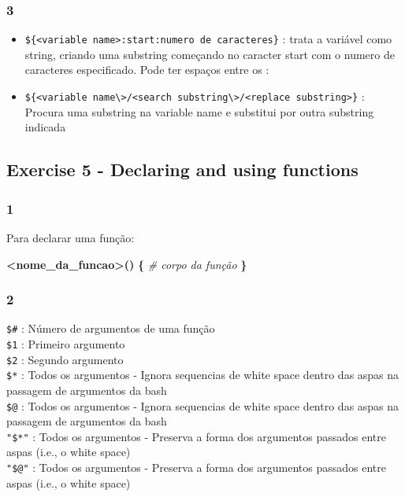 \documentclass[]{article}
\newenvironment{Shaded}{}{}
\newcommand{\KeywordTok}[1]{\textcolor[rgb]{0.00,0.44,0.13}{\textbf{{#1}}}}
\newcommand{\CommentTok}[1]{\textcolor[rgb]{0.38,0.63,0.69}{\textit{{#1}}}}
\begin{document}
\subsubsection{3}\label{section-10}

\begin{itemize}
\itemsep1pt\parskip0pt
\item
  \texttt{\$\{\textless{}variable name\textgreater{}:start:numero de caracteres\}}
  : trata a variável como string, criando uma substring começando no
  caracter start com o numero de caracteres especificado. Pode ter
  espaços entre os :\\
\item
  \texttt{\$\{\textless{}variable name\textbackslash{}\textgreater{}/\textless{}search substring\textbackslash{}\textgreater{}/\textless{}replace substring\textgreater{}\}}
  : Procura uma substring na variable name e substitui por outra
  substring indicada
\end{itemize}

\subsection{Exercise 5 - Declaring and using
functions}\label{exercise-5---declaring-and-using-functions}

\subsubsection{1}\label{section-11}

Para declarar uma função:

\begin{Shaded}
\begin{Highlighting}[]
\KeywordTok{<nome_da_funcao>()}
\KeywordTok{\{}
    \CommentTok{# corpo da função}
\KeywordTok{\}}
\end{Highlighting}
\end{Shaded}

\subsubsection{2}\label{section-12}

\texttt{\$\#} : Número de argumentos de uma função\\\texttt{\$1} :
Primeiro argumento\\\texttt{\$2} : Segundo argumento\\\texttt{\$*} :
Todos os argumentos - Ignora sequencias de white space dentro das aspas
na passagem de argumentos da bash\\\texttt{\$@} : Todos os argumentos -
Ignora sequencias de white space dentro das aspas na passagem de
argumentos da bash\\\texttt{"\$*"} : Todos os argumentos - Preserva a
forma dos argumentos passados entre aspas (i.e., o white
space)\\\texttt{"\$@"} : Todos os argumentos - Preserva a forma dos
argumentos passados entre aspas (i.e., o white space) ~
\end{document}
